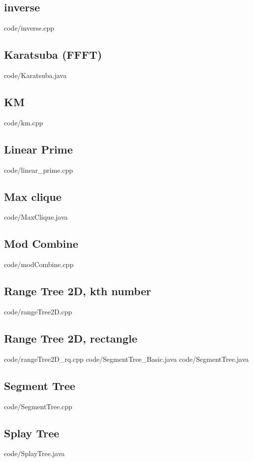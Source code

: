 \documentclass [landscape,10pt,a4paper,twocolumn,nofonts]{article}
\begin{document}
\subsection{inverse}
 {code/inverse.cpp}
\subsection{Karatsuba (FFFT)}
 {code/Karatsuba.java}
\subsection{KM}
 {code/km.cpp}
\subsection{Linear Prime}
 {code/linear_prime.cpp}
\subsection{Max clique}
 {code/MaxClique.java}
\subsection{Mod Combine}
 {code/modCombine.cpp}
\subsection{Range Tree 2D, kth number}
 {code/rangeTree2D.cpp}
\subsection{Range Tree 2D, rectangle}
 {code/rangeTree2D_rq.cpp}
 {code/SegmentTree_Basic.java}
 {code/SegmentTree.java}
\subsection{Segment Tree}
 {code/SegmentTree.cpp}
\subsection{Splay Tree}
 {code/SplayTree.java}
\end{document}
